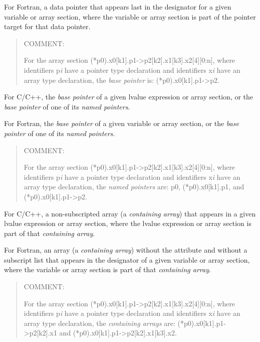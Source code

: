 For Fortran, a data pointer that appears last in the designator for a given
variable or array section, where the variable or array section is part
of the pointer target for that data pointer.

\begin{quote}
COMMENT: 

For the array section
(*p0).x0[k1].p1->p2[k2].x1[k3].x2[4][0:n],
where identifiers p\emph{i} have a pointer type declaration
and identifiers x\emph{i} have an array type declaration, the 
\emph{base pointer} is: (*p0).x0[k1].p1->p2.
\end{quote}
\glossarydefend

\glossarydefstart
For C/C++, the \emph{base pointer} of a given lvalue expression or 
array section, or the \emph{base pointer} of one of its \emph{named pointers}.

For Fortran, the \emph{base pointer} of a given variable or array section, or
the \emph{base pointer} of one of its \emph{named pointers}.

\begin{quote}
COMMENT: 

For the array section
(*p0).x0[k1].p1->p2[k2].x1[k3].x2[4][0:n],
where identifiers p\emph{i} have a pointer type declaration
and identifiers x\emph{i} have an array type declaration, the 
\emph{named pointers} are: 
p0, 
(*p0).x0[k1].p1,
and 
(*p0).x0[k1].p1->p2.
\end{quote}
\glossarydefend

\glossarydefstart
For C/C++, a non-subscripted array (a \emph{containing array}) that appears in
a given lvalue expression or array section, where the lvalue expression or
array section is part of that \emph{containing array}.

For Fortran, an array (a \emph{containing array}) without the 
attribute and without a subscript list that appears in the designator of a
given variable or array section, where the variable or array section is part
of that \emph{containing array}.

\begin{quote}
COMMENT: 

For the array section
(*p0).x0[k1].p1->p2[k2].x1[k3].x2[4][0:n],
where identifiers p\emph{i} have a pointer type declaration
and identifiers x\emph{i} have an array type declaration, 
the \emph{containing arrays} are:
    (*p0).x0[k1].p1->p2[k2].x1
and 
(*p0).x0[k1].p1->p2[k2].x1[k3].x2.
\end{quote}
\glossarydefend

